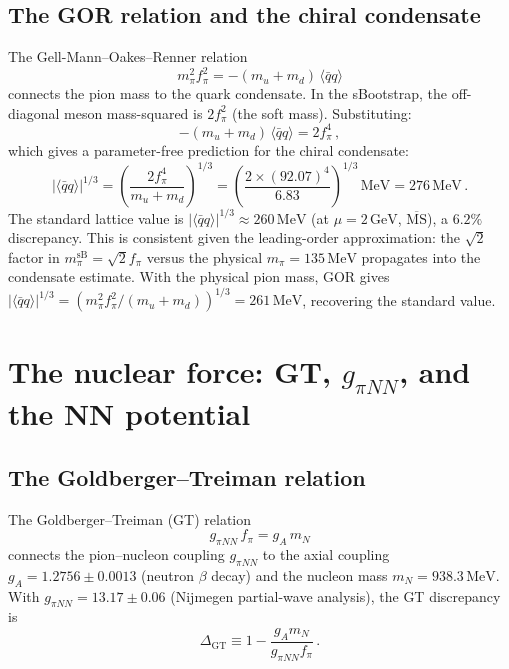 \documentclass[12pt,a4paper]{article}
\newcommand{\MeV}{\,\text{MeV}}
\newcommand{\GeV}{\,\text{GeV}}
\newcommand{\fpi}{f_\pi}
\newcommand{\qqbar}{\langle\bar{q}q\rangle}
\begin{document}
\subsection{The GOR relation and the chiral condensate}

The Gell-Mann--Oakes--Renner relation~\cite{GOR1968}
\begin{equation}
  m_\pi^2 \fpi^2 = -(m_u + m_d)\,\qqbar
\end{equation}
connects the pion mass to the quark condensate.
In the sBootstrap, the off-diagonal meson mass-squared is $2\fpi^2$
(the soft mass). Substituting:
\begin{equation}
  -(m_u + m_d)\,\qqbar = 2\fpi^4\,,
  \label{eq:qqbar_susy}
\end{equation}
which gives a parameter-free prediction for the chiral condensate:
\begin{equation}
  |\qqbar|^{1/3}
  = \left(\frac{2\fpi^4}{m_u + m_d}\right)^{1/3}
  = \left(\frac{2\times(92.07)^4}{6.83}\right)^{1/3}\MeV
  = 276\MeV\,.
\end{equation}
The standard lattice value is $|\qqbar|^{1/3} \approx 260\MeV$
(at $\mu = 2\GeV$, $\overline{\text{MS}}$), a $6.2\%$ discrepancy.
This is consistent given the leading-order approximation: the
$\sqrt{2}$ factor in $m_\pi^{\text{sB}} = \sqrt{2}\fpi$ versus the
physical $m_\pi = 135\MeV$ propagates into the condensate estimate.
With the physical pion mass, GOR gives
$|\qqbar|^{1/3} = (m_\pi^2 \fpi^2 / (m_u+m_d))^{1/3} = 261\MeV$,
recovering the standard value.

\section{The nuclear force: GT, $g_{\pi NN}$, and the NN potential}
\label{sec:nuclear}

\subsection{The Goldberger--Treiman relation}

The Goldberger--Treiman (GT) relation~\cite{GT1958}
\begin{equation}
  g_{\pi NN}\,\fpi = g_A\,m_N
  \label{eq:GT}
\end{equation}
connects the pion--nucleon coupling $g_{\pi NN}$ to the axial coupling
$g_A = 1.2756 \pm 0.0013$ (neutron $\beta$ decay) and the nucleon mass
$m_N = 938.3\MeV$.  With $g_{\pi NN} = 13.17 \pm 0.06$ (Nijmegen
partial-wave analysis), the GT discrepancy is
\begin{equation}
  \Delta_{\text{GT}} \equiv 1 - \frac{g_A m_N}{g_{\pi NN}\fpi}\,.
\end{equation}
\end{document}
